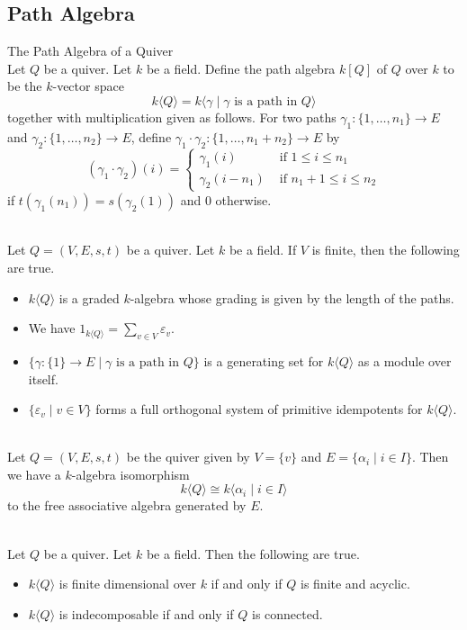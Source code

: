 \documentclass[a4paper]{article}
\begin{document}
\subsection{Path Algebra}
\begin{defn}{The Path Algebra of a Quiver}{}\\
Let $Q$ be a quiver. Let $k$ be a field. Define the path algebra $k[Q]$ of $Q$ over $k$ to be the $k$-vector space $$k\langle Q\rangle=k\langle\gamma\;|\;\gamma\text{ is a path in }Q\rangle$$ together with multiplication given as follows. For two paths $\gamma_1:\{1,\dots,n_1\}\to E$ and $\gamma_2:\{1,\dots,n_2\}\to E$, define $\gamma_1\cdot\gamma_2:\{1,\dots,n_1+n_2\}\to E$ by $$(\gamma_1\cdot\gamma_2)(i)=\begin{cases}
\gamma_1(i) & \text{ if }1\leq i\leq n_1\\
\gamma_2(i-n_1) & \text{ if }n_1+1\leq i\leq n_2
\end{cases}$$ if $t(\gamma_1(n_1))=s(\gamma_2(1))$ and $0$ otherwise. 
\end{defn}

\begin{lmm}{}{}\\
Let $Q=(V,E,s,t)$ be a quiver. Let $k$ be a field. If $V$ is finite, then the following are true. 
\begin{itemize}
\item $k\langle Q\rangle$ is a graded $k$-algebra whose grading is given by the length of the paths. 
\item We have $1_{k\langle Q\rangle}=\sum_{v\in V}\varepsilon_v$. 
\item $\{\gamma:\{1\}\to E\;|\;\gamma\text{ is a path in }Q\}$ is a generating set for $k\langle Q\rangle$ as a module over itself. 
\item $\{\varepsilon_v\;|\;v\in V\}$ forms a full orthogonal system of primitive idempotents for $k\langle Q\rangle$. 
\end{itemize}
\end{lmm}

\begin{eg}{}{}\\
Let $Q=(V,E,s,t)$ be the quiver given by $V=\{v\}$ and $E=\{\alpha_i\;|\;i\in I\}$. Then we have a $k$-algebra isomorphism $$k\langle Q\rangle\cong k\langle\alpha_i\;|\;i\in I\rangle$$ to the free associative algebra generated by $E$. 
\end{eg}

\begin{prp}{}{}\\
Let $Q$ be a quiver. Let $k$ be a field. Then the following are true. 
\begin{itemize}
\item $k\langle Q\rangle$ is finite dimensional over $k$ if and only if $Q$ is finite and acyclic. 
\item $k\langle Q\rangle$ is indecomposable if and only if $Q$ is connected. 
\end{itemize}
\end{prp}
\end{document}
